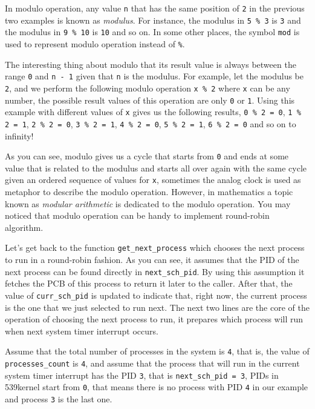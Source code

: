 In modulo operation, any value \lstinline!n! that has the same position
of \lstinline!2! in the previous two examples is known as
\emph{modulus}. For instance, the modulus in \lstinline!5 % 3! is
\lstinline!3! and the modulus in \lstinline!9 % 10! is \lstinline!10!
and so on. In some other places, the symbol \lstinline!mod! is used to
represent modulo operation instead of \lstinline!%!.

The interesting thing about modulo that its result value is always
between the range \lstinline!0! and \lstinline!n - 1! given that
\lstinline!n! is the modulus. For example, let the modulus be
\lstinline!2!, and we perform the following modulo operation
\lstinline!x % 2! where \lstinline!x! can be any number, the possible
result values of this operation are only \lstinline!0! or \lstinline!1!.
Using this example with different values of \lstinline!x! gives us the
following results, \lstinline!0 % 2 = 0!, \lstinline!1 % 2 = 1!,
\lstinline!2 % 2 = 0!, \lstinline!3 % 2 = 1!, \lstinline!4 % 2 = 0!,
\lstinline!5 % 2 = 1!, \lstinline!6 % 2 = 0! and so on to infinity!

As you can see, modulo gives us a cycle that starts from \lstinline!0!
and ends at some value that is related to the modulus and starts all
over again with the same cycle given an ordered sequence of values for
\lstinline!x!, sometimes the analog clock is used as metaphor to
describe the modulo operation. However, in mathematics a topic known as
\emph{modular arithmetic} is dedicated to the modulo operation. You may
noticed that modulo operation can be handy to implement round-robin
algorithm.

Let's get back to the function \lstinline!get_next_process! which
chooses the next process to run in a round-robin fashion. As you can
see, it assumes that the PID of the next process can be found directly
in \lstinline!next_sch_pid!. By using this assumption it fetches the PCB
of this process to return it later to the caller. After that, the value
of \lstinline!curr_sch_pid! is updated to indicate that, right now, the
current process is the one that we just selected to run next. The next
two lines are the core of the operation of choosing the next process to
run, it prepares which process will run when next system timer interrupt
occurs.

Assume that the total number of processes in the system is
\lstinline!4!, that is, the value of \lstinline!processes_count! is
\lstinline!4!, and assume that the process that will run in the current
system timer interrupt has the PID \lstinline!3!, that is
\lstinline!next_sch_pid = 3!, PIDs in 539kernel start from
\lstinline!0!, that means there is no process with PID \lstinline!4! in
our example and process \lstinline!3! is the last one.


